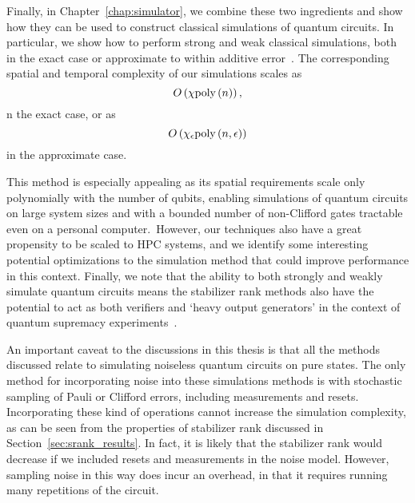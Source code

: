 Finally, in Chapter~\ref{chap:simulator}, we combine these two ingredients and show how they can be used to construct classical simulations of quantum circuits. In particular, we show how to perform strong and weak classical simulations, both in the exact case or approximate to within additive error~\cite{Bravyi2018}. The corresponding spatial and temporal complexity of our simulations scales as
\begin{equation}
O\left(\chi \text{poly}\left(n\right)\right),\label{eq:exact_complexity}
\end{equation} 
n the exact case, or as
\begin{equation}
O\left(\chi_{\epsilon}\text{poly}\left(n,\epsilon\right)\right)\label{eq:approximate_complexity}
\end{equation}in the approximate case.\par
This method is especially appealing as its spatial requirements scale only polynomially with the number of qubits, enabling simulations of quantum circuits on large system sizes and with a bounded number of non-Clifford gates tractable even on a personal computer.\ However, our techniques also have a great propensity to be scaled to HPC systems, and we identify some interesting potential optimizations to the simulation method that could improve performance in this context. Finally, we note that the ability to both strongly and weakly simulate quantum circuits means the stabilizer rank methods also have the potential to act as both verifiers and `heavy output generators' in the context of quantum supremacy experiments~\cite{Aaronson2016}.\par
An important caveat to the discussions in this thesis is that all the methods discussed relate to simulating noiseless quantum circuits on pure states. The only method for incorporating noise into these simulations methods is with stochastic sampling of Pauli or Clifford errors, including measurements and resets. Incorporating these kind of operations cannot increase the simulation complexity, as can be seen from the properties of stabilizer rank discussed in Section~\ref{sec:srank_results}. In fact, it is likely that the stabilizer rank would decrease if we included resets and measurements in the noise model. However, sampling noise in this way does incur an overhead, in that it requires running many repetitions of the circuit.\par
